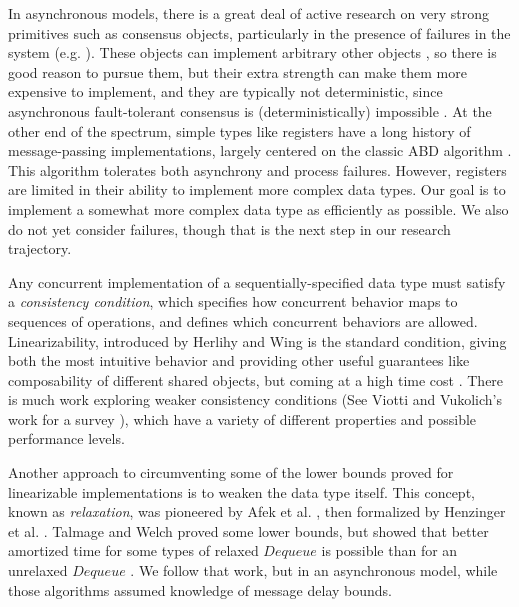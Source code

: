 \documentclass[a4paper,anonymous,USenglish]{lipics-v2021}
\theoremstyle{definition}
\begin{document}
In asynchronous models, there is a great deal of active research on very strong primitives such as consensus objects, particularly in the presence of failures in the system (e.g. \cite{PuFarahbakhshAlvisiEyal23,CohenKeidar23}).  These objects can implement arbitrary other objects \cite{Herlihy91}, so there is good reason to pursue them, but their extra strength can make them more expensive to implement, and they are typically not deterministic, since asynchronous fault-tolerant consensus is (deterministically) impossible \cite{FischerLynchPaterson85}.  At the other end of the spectrum, simple types like registers have a long history of message-passing implementations, largely centered on the classic ABD algorithm \cite{AttiyaBar-NoyDolev95}.  This algorithm tolerates both asynchrony and process failures.  However, registers are limited in their ability to implement more complex data types.  Our goal is to implement a somewhat more complex data type as efficiently as possible.  We also do not yet consider failures, though that is the next step in our research trajectory.

Any concurrent implementation of a sequentially-specified data type must satisfy a \emph{consistency condition}, which specifies how concurrent behavior maps to sequences of operations, and defines which concurrent behaviors are allowed.  Linearizability, introduced by Herlihy and Wing \cite{HerlihyWing90} is the standard condition, giving both the most intuitive behavior and providing other useful guarantees like composability of different shared objects, but coming at a high time cost \cite{AttiyaWelch94}.  There is much work exploring weaker consistency conditions (See Viotti and Vukolich's work for a survey \cite{viottiVukolic16}), which have a variety of different properties and possible performance levels.

Another approach to circumventing some of the lower bounds proved for linearizable implementations is to weaken the data type itself.  This concept, known as \emph{relaxation}, was pioneered by Afek et al. \cite{AfekKorlandYanovsky10}, then formalized by Henzinger et al. \cite{HenzingerKirschPayerSezginSokolova13}.  Talmage and Welch proved some lower bounds, but showed that better amortized time for some types of relaxed $Dequeue$ is possible than for an unrelaxed $Dequeue$ \cite{TalmageWelch14}.  We follow that work, but in an asynchronous model, while those algorithms assumed knowledge of message delay bounds.
\end{document}
